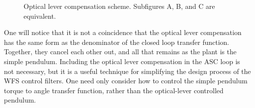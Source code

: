 \begin{figure} 
\begin{centering} 
  
\caption[Optical lever compensation scheme]{Optical lever compensation scheme. Subfigures A, B, and C are equivalent.}  
\label{fig:OLcomp} 
\end{centering} 
\end{figure}

One will notice that it is not a coincidence that the optical lever compensation has the same form as the denominator of the closed loop transfer function. Together, they cancel each other out, and all that remains as the plant is the simple pendulum. Including the optical lever compensation in the ASC loop is not necessary, but it is a useful technique for simplifying the design process of the WFS control filters. One need only consider how to control the simple pendulum torque to angle transfer function, rather than the optical-lever controlled pendulum.









